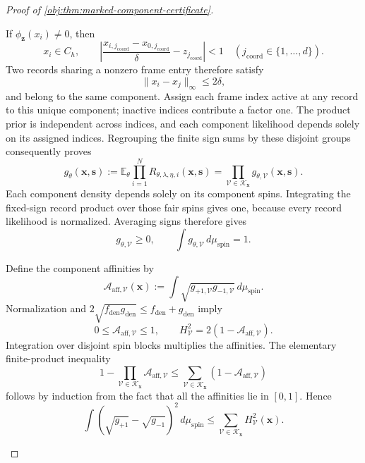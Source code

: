\begin{proof}[Proof of \cref{obj:thm:marked-component-certificate}]
\begin{enumerate}
If \(\phi_{\mathbf z}(x_i)\ne0\), then
\[
x_i\in C_h,
\qquad
\left|\frac{x_{i,j_{\mathrm{coord}}}-x_{0,j_{\mathrm{coord}}}}{\delta}-z_{j_{\mathrm{coord}}}\right|<1
\quad(j_{\mathrm{coord}}\in\{1,\ldots,d\}).
\]
Two records sharing a nonzero frame entry therefore satisfy
\[
\|x_i-x_j\|_\infty\le2\delta,
\]
and belong to the same component. Assign each frame index active at any record to this unique component; inactive indices contribute a factor one. The product prior is independent across indices, and each component likelihood depends solely on its assigned indices. Regrouping the finite sign sums by these disjoint groups consequently proves
\[
g_\theta(\mathbf x,\mathbf s)
:=
\mathbb E_\theta
\prod_{i=1}^{N}R_{\theta,\lambda,\eta,i}(\mathbf x,\mathbf s)
=
\prod_{\mathcal V\in\mathscr K_{\mathbf x}}
g_{\theta,\mathcal V}(\mathbf x,\mathbf s).
\]
Each component density depends solely on its component spins. Integrating the fixed-sign record product over those fair spins gives one, because every record likelihood is normalized. Averaging signs therefore gives
\[
g_{\theta,\mathcal V}\ge0,
\qquad
\int g_{\theta,\mathcal V}\,d\mu_{\mathrm{spin}}=1.
\]

Define the component affinities by
\[
\mathcal A_{\mathrm{aff},\mathcal V}(\mathbf x)
:=
\int\sqrt{g_{+1,\mathcal V}g_{-1,\mathcal V}}\,
d\mu_{\mathrm{spin}}.
\]
Normalization and \(2\sqrt{f_{\mathrm{den}}g_{\mathrm{den}}}
\le f_{\mathrm{den}}+g_{\mathrm{den}}\) imply
\[
0\le\mathcal A_{\mathrm{aff},\mathcal V}\le1,
\qquad
H_{\mathcal V}^2
=2(1-\mathcal A_{\mathrm{aff},\mathcal V}).
\]
Integration over disjoint spin blocks multiplies the affinities. The elementary finite-product inequality
\[
1-\prod_{\mathcal V\in\mathscr K_{\mathbf x}}
\mathcal A_{\mathrm{aff},\mathcal V}
\le
\sum_{\mathcal V\in\mathscr K_{\mathbf x}}
(1-\mathcal A_{\mathrm{aff},\mathcal V})
\]
follows by induction from the fact that all the affinities lie in \([0,1]\). Hence
\[
\int(\sqrt{g_{+1}}-\sqrt{g_{-1}})^2\,d\mu_{\mathrm{spin}}
\le
\sum_{\mathcal V\in\mathscr K_{\mathbf x}}
H_{\mathcal V}^2(\mathbf x).
\]


\end{enumerate}
\end{proof}
